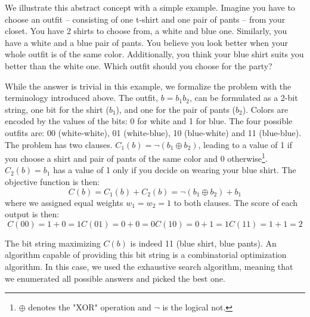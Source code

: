 We illustrate this abstract concept with a simple example. Imagine you  have to choose an outfit -- consisting of one t-shirt and one pair of pants -- from your closet. You have 2 shirts to choose from, a white and blue one. Similarly, you have a white and a blue pair of pants. You believe you look better when your whole outfit is of the same color. Additionally, you think your blue shirt suits you better than the white one. Which outfit should you choose for the party? 

While the answer is trivial in this example, we formalize the problem with the terminology introduced above. The outfit, $b = b_1b_2 $, can be formulated as a 2-bit string, one bit for the shirt ($b_1$), and one for the pair of pants ($b_2$). Colors are encoded by the values of the bits: 0 for white and 1 for blue. The four possible outfits are: 00 (white-white), 01 (white-blue), 10 (blue-white) and 11 (blue-blue). The problem has two clauses. $C_1(b) = \neg (b_1 \oplus b_2)$, leading to a value of 1 if you choose a shirt and pair of pants of the same color and 0 otherwise\footnote{$\oplus$ denotes the "XOR" operation and $\neg$ is the logical not.}. $C_2(b) = b_1$ has a value of 1 only if you decide on wearing your blue shirt. The objective function is then:
\begin{equation}
    C(b) = C_1(b) + C_2(b) = \neg (b_1 \oplus b_2) + b_1
\end{equation}
where we assigned equal weights $w_1 = w_2 = 1$ to both clauses.
The score of each output is then:
\begin{subequations}
\begin{equation}
     C(00) = 1 + 0 = 1
\end{equation}
\begin{equation}
    C(01) = 0 + 0 = 0
\end{equation}
  \begin{equation}
      C(10) = 0 +  1 = 1
  \end{equation}
  \begin{equation}
         C(11) = 1 + 1 = 2
  \end{equation}
\end{subequations}

The bit string maximizing $C(b)$ is indeed 11 (blue shirt, blue pants). An algorithm capable of providing this bit string is a combinatorial optimization algorithm. In this case, we used the exhaustive search algorithm, meaning that we enumerated all possible answers and picked the best one. 

